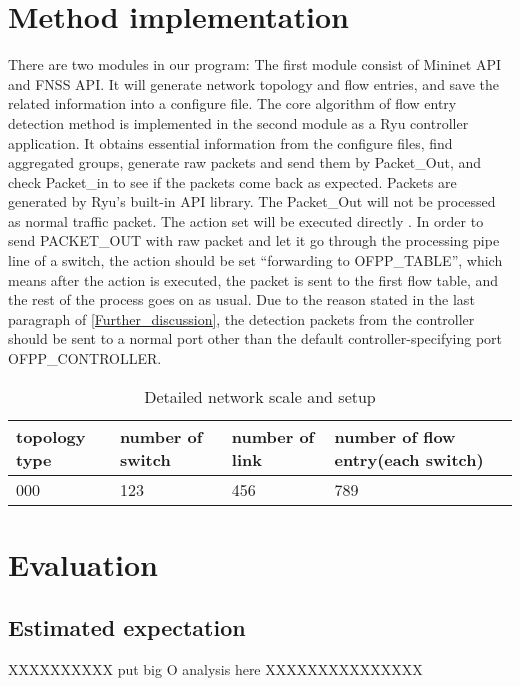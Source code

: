 \section{Method implementation} 
There are two modules in our program: The first module consist of Mininet API and FNSS API. It will generate network topology and flow entries, and save the related information into a configure file. The core algorithm of flow entry detection method is implemented in the second module as a Ryu controller application. It obtains essential information from the configure files, find aggregated groups, generate raw packets and send them by Packet\_Out, and check Packet\_in to see if the packets come back as expected. Packets are generated by Ryu's built-in API library. The Packet\_Out will not be processed as normal traffic packet. The action set will be executed directly \cite{PACKETOUT}. In order to send PACKET\_OUT with raw packet and let it go through the processing pipe line of a switch, the action should be set ``forwarding to OFPP\_TABLE'', which means after the action is executed, the packet is sent to the first flow table, and the rest of the process goes on as usual. Due to the reason stated in the last paragraph of \ref{Further_discussion}, the detection packets from the controller should be sent to a normal port other than the default controller-specifying port OFPP\_CONTROLLER. 

\begin{table}[H]
\centering
\caption{Detailed network scale and setup}
\begin{tabular}{|l|p{4cm}|p{4.5cm}|p{4.5cm}|}
\hline  topology type & number of switch & number of link & number of flow entry(each switch) \\
\hline 000 & 123 & 456 & 789	\\
\hline 
\end{tabular}
\label{table:network_env}
\end{table}

\section{}

\section{Evaluation}

\subsection{Estimated expectation}
XXXXXXXXXX put big O analysis here XXXXXXXXXXXXXXX
